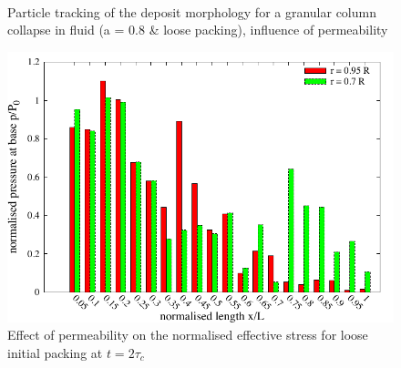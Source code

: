 \begin{figure}
\centering
{}\\
\caption{Particle tracking of the deposit morphology
for a granular column collapse in fluid (a = 0.8 \& loose packing), influence 
of permeability}
\label{fig:Loose_a08_permeability}
\end{figure}

\begin{figure}
\centering
\includegraphics[width=0.97\columnwidth]{a08/effective_stress_a08}
\caption{Effect of permeability on the normalised effective stress for loose 
initial packing at $t = 2\tau_c$}
\label{fig:effective_stress_a08}
\end{figure}

